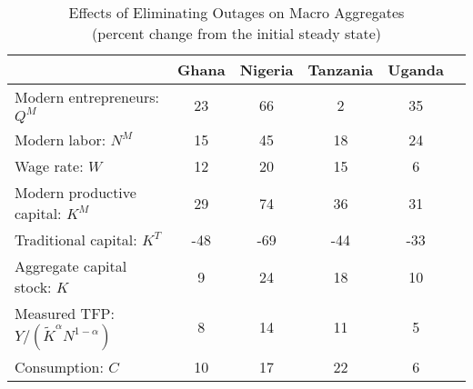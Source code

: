 \begin{table}[H] 
\center 
\singlespace 
\caption{Effects of Eliminating Outages on Macro Aggregates\\ (percent change from the initial steady state)} \label{agg}
\vspace{-.1in} 
\begin{tabular}{l c c c c c}\hline 
   & Ghana & Nigeria & Tanzania & Uganda    \\  
\hline 
 Modern entrepreneurs: $Q^M$ &       23 &       66 &        2  &       35    \\   Modern labor: $N^M$ &       15 &       45 &       18  &       24    \\   Wage rate: $W$ &       12 &       20 &       15  &        6     \\  Modern productive capital: $K^M$ &       29 &       74 &       36  &       31     \\ Traditional capital: $K^T$ &      -48 &      -69 &      -44  &      -33     \\  Aggregate capital stock: $K$ &        9 &       24 &       18  &       10     \\  Measured TFP: $Y/(\tilde{K}^\alpha N^{1-\alpha})$ &        8 &       14 &       11  &        5    \\  Consumption: $C$ &       10 &       17 &       22  &        6    \\  \hline 
\end{tabular}
\end{table} 
